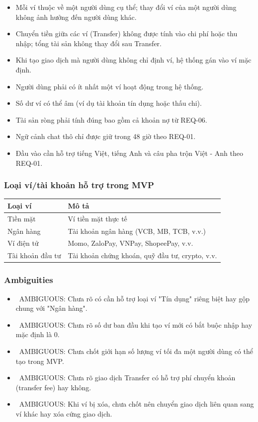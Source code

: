 \begin{itemize}
\item Mỗi ví thuộc về một người dùng cụ thể; thay đổi ví của một người dùng không ảnh hưởng đến người dùng khác.
\item Chuyển tiền giữa các ví (Transfer) không được tính vào chi phí hoặc thu nhập; tổng tài sản không thay đổi sau Transfer.
\item Khi tạo giao dịch mà người dùng không chỉ định ví, hệ thống gán vào ví mặc định.
\item Người dùng phải có ít nhất một ví hoạt động trong hệ thống.
\item Số dư ví có thể âm (ví dụ tài khoản tín dụng hoặc thấu chi).
\item Tài sản ròng phải tính đúng bao gồm cả khoản nợ từ REQ-06.
\item Ngữ cảnh chat thô chỉ được giữ trong 48 giờ theo REQ-01.
\item Đầu vào cần hỗ trợ tiếng Việt, tiếng Anh và câu pha trộn Việt - Anh theo REQ-01.
\end{itemize}
\subsubsection{Loại ví/tài khoản hỗ trợ trong MVP}

\begin{table}[htbp]
\centering
\begin{tabularx}{\textwidth}{|l|X|}
\hline
Loại ví & Mô tả \\ \hline
Tiền mặt & Ví tiền mặt thực tế \\ \hline
Ngân hàng & Tài khoản ngân hàng (VCB, MB, TCB, v.v.) \\ \hline
Ví điện tử & Momo, ZaloPay, VNPay, ShopeePay, v.v. \\ \hline
Tài khoản đầu tư & Tài khoản chứng khoán, quỹ đầu tư, crypto, v.v. \\ \hline
\end{tabularx}
\end{table}



\subsubsection{Ambiguities}

\begin{itemize}
\item \warningicon\  AMBIGUOUS: Chưa rõ có cần hỗ trợ loại ví "Tín dụng" riêng biệt hay gộp chung với "Ngân hàng".
\item \warningicon\  AMBIGUOUS: Chưa rõ số dư ban đầu khi tạo ví mới có bắt buộc nhập hay mặc định là 0.
\item \warningicon\  AMBIGUOUS: Chưa chốt giới hạn số lượng ví tối đa một người dùng có thể tạo trong MVP.
\item \warningicon\  AMBIGUOUS: Chưa rõ giao dịch Transfer có hỗ trợ phí chuyển khoản (transfer fee) hay không.
\item \warningicon\  AMBIGUOUS: Khi ví bị xóa, chưa chốt nên chuyển giao dịch liên quan sang ví khác hay xóa cứng giao dịch.
\end{itemize}

